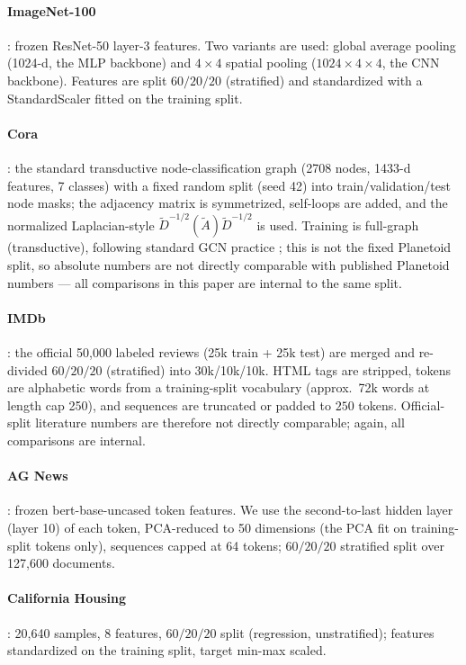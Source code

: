 \documentclass{article} %
\begin{document}
\paragraph{ImageNet-100} \citep{deng2009imagenet}: frozen ResNet-50 \citep{he2016resnet}
layer-3 features. Two variants are used: global average pooling (1024-d, the MLP
backbone) and $4\times4$ spatial pooling ($1024\times4\times4$, the CNN backbone).
Features are split $60/20/20$ (stratified) and standardized with a StandardScaler fitted
on the training split.

\paragraph{Cora} \citep{sen2008collective}: the standard transductive node-classification
graph (2708 nodes, 1433-d features, 7 classes) with a fixed random split (seed 42) into
train/validation/test node masks; the adjacency matrix is symmetrized, self-loops are
added, and the normalized Laplacian-style $\tilde D^{-1/2}(\tilde A)\tilde D^{-1/2}$ is
used. Training is full-graph (transductive), following standard GCN practice
\citep{kipf2017gcn}; this is not the fixed Planetoid split, so absolute numbers are not
directly comparable with published Planetoid numbers --- all comparisons in this paper
are internal to the same split.

\paragraph{IMDb} \citep{maas2011imdb}: the official 50{,}000 labeled reviews (25k train +
25k test) are merged and re-divided $60/20/20$ (stratified) into 30k/10k/10k. HTML tags
are stripped, tokens are alphabetic words from a training-split vocabulary (approx.\
72k words at length cap 250), and sequences are truncated or padded to $250$ tokens.
Official-split literature numbers are therefore not directly comparable; again, all
comparisons are internal.

\paragraph{AG News} \citep{zhang2015character}: frozen bert-base-uncased
\citep{devlin2019bert} token features. We use the second-to-last hidden layer (layer 10)
of each token, PCA-reduced to 50 dimensions (the PCA fit on training-split tokens only),
sequences capped at 64 tokens; $60/20/20$ stratified split over 127{,}600 documents.

\paragraph{California Housing} \citep{pace1997sparse}: 20{,}640 samples, 8 features,
$60/20/20$ split (regression, unstratified); features standardized on the training split,
target min-max scaled.
\end{document}
